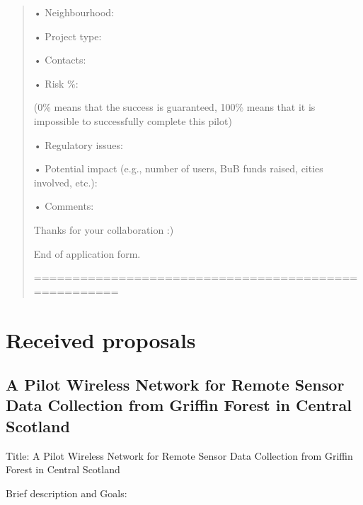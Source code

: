 \documentclass[draftclsnofoot,12pt,journal,onecolumn]{IEEEtran}
\begin{document}
\begin{quotation}
• Neighbourhood:

• Project type:

• Contacts:

• Risk \%:

(0\% means that the success is guaranteed, 100\% means that it is
impossible to successfully complete this pilot)

• Regulatory issues:

• Potential impact (e.g., number of users, BuB funds raised, cities
involved, etc.):

• Comments:


Thanks for your collaboration :)

End of application form.

=====================================================
\end{quotation}

\section{Received proposals}
\label{sec:received}

\subsection{A Pilot Wireless Network for Remote Sensor Data Collection from Griffin Forest in Central Scotland}

Title: A Pilot Wireless Network for Remote Sensor Data Collection from Griffin Forest in Central
Scotland

Brief description and Goals:
\end{document}
